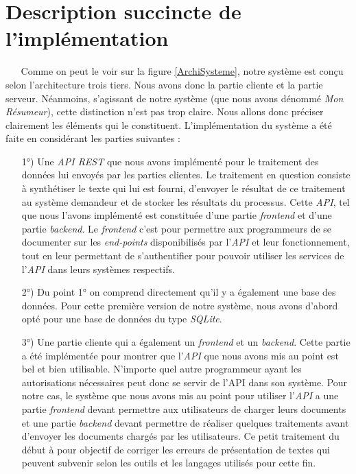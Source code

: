 \section{Description succincte de l'implémentation}
$ _{} $ $ _{} $ $ _{} $ $ _{} $ $ _{} $Comme on peut le voir sur la figure \ref{ArchiSysteme}, notre système est conçu selon l'architecture trois tiers. Nous avons donc la partie cliente et la partie serveur. Néanmoins, s'agissant de notre système (que nous avons dénommé \textit{Mon Résumeur}), cette distinction n'est pas trop claire. Nous allons donc préciser clairement les éléments qui le constituent. L'im\-plé\-men\-ta\-tion du système a été faite en considérant les parties suivantes :
\begin{itemize}
\item[1°)] Une \textit{API REST} que nous avons implémenté pour le traitement des données lui envoyés par les parties clientes. Le traitement en question consiste à synthétiser le texte qui lui est fourni, d'envoyer le résultat de ce traitement au système demandeur et de stocker les résultats du processus. Cette \textit{API}, tel que nous l'avons implémenté est constituée d'une partie \textit{frontend} et d'une partie \textit{backend}. Le \textit{frontend} c'est pour permettre aux programmeurs de se documenter sur les \textit{end-points} disponibilisés par l'\textit{API} et leur fonctionnement, tout en leur permettant de s'authentifier pour pouvoir utiliser les services de l'\textit{API} dans leurs systèmes respectifs.
\item[2°)] Du point 1° on comprend directement qu'il y a également une base des données. Pour cette première version de notre système, nous avons d'abord opté pour une base de données du type \textit{SQLite}.
\item[3°)] Une partie cliente qui a également un \textit{frontend} et un \textit{backend}. Cette partie a été implémentée pour montrer que l'\textit{API} que nous avons mis au point est bel et bien utilisable. N'importe quel autre programmeur ayant les autorisations nécessaires peut donc se servir de l'API dans son système. Pour notre cas, le système que nous avons mis au point pour utiliser l'\textit{API} a une partie \textit{frontend} devant permettre aux utilisateurs de charger leurs documents et une partie \textit{backend} devant permettre de réaliser quelques traitements avant d'envoyer les documents chargés par les u\-ti\-li\-sa\-teurs. Ce petit traitement du début à pour objectif de corriger les erreurs de présentation de textes qui peuvent subvenir selon les outils et les langages utilisés pour cette fin.
\end{itemize}
